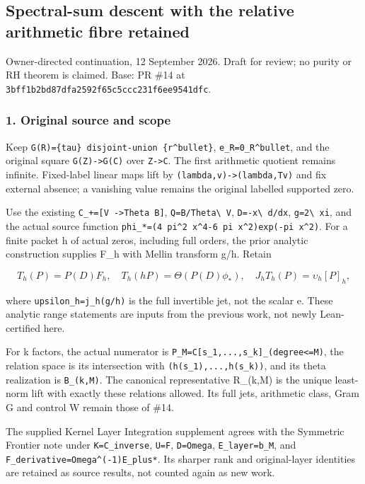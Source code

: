 \subsection{Spectral-sum descent with the relative arithmetic fibre
retained}\label{pr_17:spectral-sum-descent-with-the-relative-arithmetic-fibre-retained}

Owner-directed continuation, 12 September 2026. Draft for review; no purity or RH theorem is
claimed. Base: PR \#14 at \nolinkurl{3bff1b2bd87dfa2592f65c5ccc231f6ee9541dfc}.

\subsubsection{1. Original source and scope}\label{pr_17:original-source-and-scope}

Keep \texttt{G(R)=\{tau\}\ disjoint-union\ \{r\^{}bullet\}}, \texttt{e\_R=0\_R\^{}bullet}, and the
original square \texttt{G(Z)-\textgreater{}G(C)} over \texttt{Z-\textgreater{}C}. The first
arithmetic quotient remains infinite. Fixed-label linear maps lift by
\texttt{(lambda,v)-\textgreater{}(lambda,Tv)} and fix external absence; a vanishing value remains
the original labelled supported zero.

Use the existing \texttt{C\_+={[}V\ -\textgreater{}Theta\ B{]}}, \nolinkurl{Q=B/Theta\ V},
\nolinkurl{D=-x\ d/dx}, \nolinkurl{g=2\ xi}, and the actual source function
\texttt{phi\_*=(4\ pi\^{}2\ x\^{}4-6\ pi\ x\^{}2)exp(-pi\ x\^{}2)}. For a finite packet h of actual
zeros, including full orders, the prior analytic construction supplies F\_h with Mellin transform
g/h. Retain

\[T_h(P)=P(D)F_h,\quad T_h(hP)=\Theta(P(D)\phi_*),\quad J_hT_h(P)=\upsilon_h[P]_h,\]

where \nolinkurl{upsilon_h=j_h(g/h)} is the full invertible jet, not the scalar e. These analytic
range statements are inputs from the previous work, not newly Lean-certified here.

For k factors, the actual numerator is \texttt{P\_M=C{[}s\_1,...,s\_k{]}\_(degree\textless{}=M)},
the relation space is its intersection with \nolinkurl{(h(s_1),...,h(s_k))}, and its theta
realization is \nolinkurl{B_(k,M)}. The canonical representative R\_(k,M) is the unique least-norm
lift with exactly these relations allowed. Its full jets, arithmetic class, Gram G and control W
remain those of \#14.

The supplied Kernel Layer Integration supplement agrees with the Symmetric Frontier note under
\nolinkurl{K=C_inverse}, \nolinkurl{U=F}, \nolinkurl{D=Omega}, \nolinkurl{E_layer=b_M}, and
\texttt{F\_derivative=Omega\^{}(-1)E\_plus*}. Its sharper rank and original-layer identities are
retained as source results, not counted again as new work.

